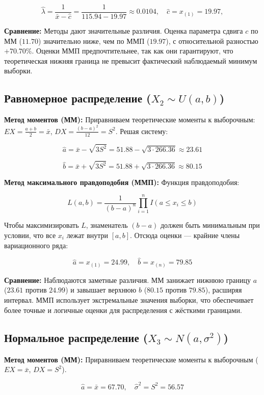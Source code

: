 $$
\hat{\lambda} = \frac{1}{\bar{x} - \hat{c}} = \frac{1}{115.94 - 19.97} \approx 0.0104 ,\quad  \hat{c} = x_{(1)} = 19.97, 
$$

\textbf{Сравнение:} Методы дают значительные различия. Оценка параметра сдвига $c$ по ММ ($11.70$) значительно ниже, чем по ММП ($19.97$), с относительной разностью $+70.70\%$. Оценки ММП предпочтительнее, так как они гарантируют, что теоретическая нижняя граница не превысит фактический наблюдаемый минимум выборки.


\subsection{Равномерное распределение ($X_2 \sim U(a, b)$)}

\textbf{Метод моментов (ММ):} Приравниваем теоретические моменты к выборочным: $EX = \frac{a+b}{2} = \bar{x}$, $DX = \frac{(b-a)^2}{12} = S^2$. Решая систему:

$$
\hat{a} = \bar{x} - \sqrt{3S^2} = 51.88 - \sqrt{3 \cdot 266.36} \approx 23.61
$$

$$
\hat{b} = \bar{x} + \sqrt{3S^2} = 51.88 + \sqrt{3 \cdot 266.36} \approx 80.15
$$

\textbf{Метод максимального правдоподобия (ММП):} Функция правдоподобия:

$$
L(a, b) = \frac{1}{(b-a)^n} \prod_{i=1}^{n} I(a \le x_i \le b)
$$

Чтобы максимизировать $L$, знаменатель $(b-a)$ должен быть минимальным при условии, что все $x_i$ лежат внутри $[a, b]$. Отсюда оценки — крайние члены вариационного ряда:

$$
\hat{a} = x_{(1)} = 24.99, \quad \hat{b} = x_{(n)} = 79.85
$$

\textbf{Сравнение:} Наблюдаются заметные различия. ММ занижает нижнюю границу $a$ ($23.61$ против $24.99$) и завышает верхнюю $b$ ($80.15$ против $79.85$), расширяя интервал. ММП использует экстремальные значения выборки, что обеспечивает более точные и логичные оценки для распределения с жёсткими границами.

\subsection{Нормальное распределение ($X_3 \sim N(a, \sigma^2)$)}

\textbf{Метод моментов (ММ):} Приравниваем теоретические моменты к выборочным ($EX = \bar{x}$, $DX = S^2$).

$$
\hat{a} = \bar{x} = 67.70, \quad \hat{\sigma}^2 = S^2 = 56.57
$$


